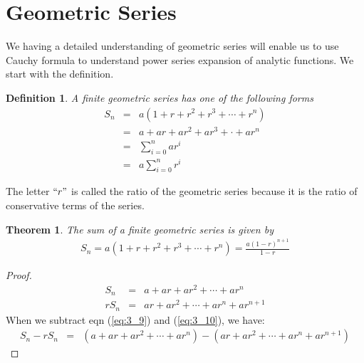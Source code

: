 \documentclass[11pt]{report}
\newcommand{\sps}{\\[0.2cm]}
\newcommand{\refn}[1]{(\ref{#1})}
\newcommand{\refx}[1]{\refn{eq:#1}}
\newtheorem{theorem}{Theorem}[chapter]
\newtheorem{definition}{Definition}[chapter]
\begin{document}
	\section{Geometric Series}
	We having a detailed understanding of geometric series will enable us to use Cauchy formula to understand power series expansion of analytic functions. We start with the definition.
	\begin{definition}
		A finite geometric series has one of the following forms
		\begin{eqnarray*}
			S_n &=& a(1+r+r^2+r^3+\cdots + r^n)\sps
			&=& a+ ar + ar^2 + ar^3 + \cdot + ar^n\sps
			&=& \sum_{i=0}^{n}ar^i\sps
			&=& a\sum_{i=0}^{n}r^i
		\end{eqnarray*}
	\end{definition}
	The letter $``r"$ is called the ratio of the geometric series because it is the ratio of conservative terms of the series.
	
	\begin{theorem}
		The sum of a finite geometric series is given by 
		\begin{eqnarray*}
			S_n = a(1+r+r^2+r^3+\cdots + r^n)= \frac{a(1-r)^{n+1}}{1-r}
		\end{eqnarray*}
	\end{theorem}
	\begin{proof}
		\begin{eqnarray}
			S_n &=& a+ar + ar^2 + \cdots + ar^n\sps \label{eq:3_9}
			rS_n &=& ar + ar^2 + \cdots + ar^n + ar^{n+1}\label{eq:3_10}
		\end{eqnarray}
		When we subtract eqn \refx{3_9} and \refx{3_10}, we have:
		\begin{eqnarray*}
			S_n - rS_n &=&(a+ar+ar^2+\cdots + ar^n) - (ar+ar^2+\cdots+ar^n+ar^{n+1})
		\end{eqnarray*}
	\end{proof}
\end{document}
